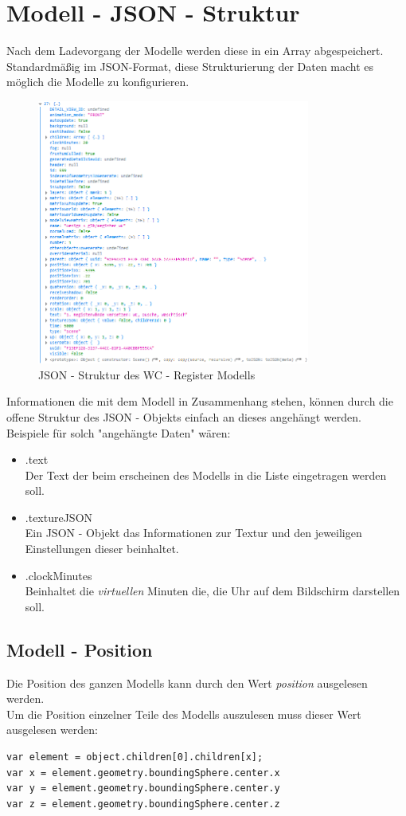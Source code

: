 \section{Modell - JSON - Struktur}\label{sec:Modell - JSON - Struktur}
Nach dem Ladevorgang der Modelle werden diese in ein Array abgespeichert. Standardmäßig im JSON-Format, diese Strukturierung der Daten macht es möglich die Modelle zu konfigurieren.
\begin{figure}[h]
    \centering
    \includegraphics[width=0.8\textwidth]{images/json.PNG}
    \caption{JSON - Struktur des WC - Register Modells}
    \label{fig:my_label}
\end{figure} 
Informationen die mit dem Modell in Zusammenhang stehen, können durch die offene Struktur des JSON - Objekts einfach an dieses angehängt werden. \\
Beispiele für solch "angehängte Daten" wären:
\begin{itemize}
    \item .text \\
    Der Text der beim erscheinen des Modells in die Liste eingetragen werden soll.
    \item .textureJSON \\
    Ein JSON - Objekt das Informationen zur Textur und den jeweiligen Einstellungen dieser beinhaltet. 
    \item .clockMinutes \\
    Beinhaltet die \textit{virtuellen} Minuten die, die Uhr auf dem Bildschirm darstellen soll.
\end{itemize}
\newpage
\subsection{Modell - Position}
Die Position des ganzen Modells kann durch den Wert \textit{position} ausgelesen werden. \\
Um die Position einzelner Teile des Modells auszulesen muss dieser Wert ausgelesen werden:
\begin{lstlisting}
var element = object.children[0].children[x];
var x = element.geometry.boundingSphere.center.x
var y = element.geometry.boundingSphere.center.y
var z = element.geometry.boundingSphere.center.z
\end{lstlisting}
